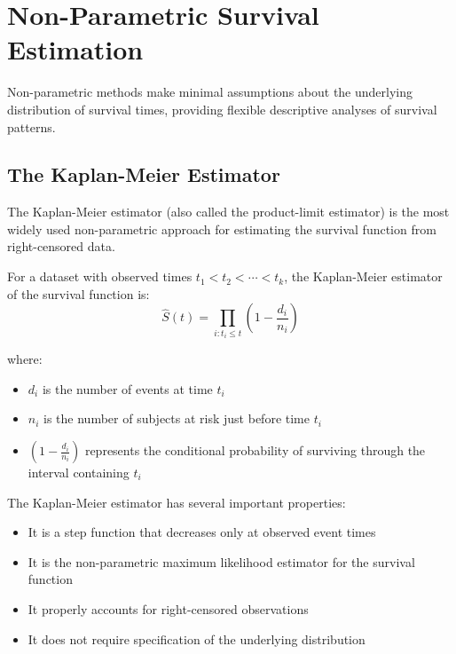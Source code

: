 \section{Non-Parametric Survival Estimation}

Non-parametric methods make minimal assumptions about the underlying distribution of survival times, providing flexible descriptive analyses of survival patterns.

\subsection{The Kaplan-Meier Estimator}

The Kaplan-Meier estimator (also called the product-limit estimator) is the most widely used non-parametric approach for estimating the survival function from right-censored data.

\begin{definitionbox}[title=Kaplan-Meier Estimator]
For a dataset with observed times $t_1 < t_2 < \cdots < t_k$, the Kaplan-Meier estimator of the survival function is:
\begin{equation}
    \hat{S}(t) = \prod_{i: t_i \leq t} \left(1 - \frac{d_i}{n_i}\right)
\end{equation}

where:
\begin{itemize}
    \item $d_i$ is the number of events at time $t_i$
    \item $n_i$ is the number of subjects at risk just before time $t_i$
    \item $\left(1 - \frac{d_i}{n_i}\right)$ represents the conditional probability of surviving through the interval containing $t_i$
\end{itemize}
\end{definitionbox}

The Kaplan-Meier estimator has several important properties:
\begin{itemize}
    \item It is a step function that decreases only at observed event times
    \item It is the non-parametric maximum likelihood estimator for the survival function
    \item It properly accounts for right-censored observations
    \item It does not require specification of the underlying distribution
\end{itemize}

